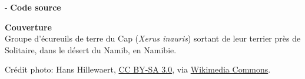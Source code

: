 \begin{adjustwidth*}{\unitlength}{-\unitlength}
  \textbf{Code source} \\
  \viewsource{\reposurl}

  \textbf{Couverture} \\
  Groupe d'écureuils de terre du Cap (\emph{Xerus inauris}) sortant de
  leur terrier près de Solitaire, dans le désert du Namib, en Namibie.

  Crédit photo: {\textcopyright} Hans Hillewaert,
  \href{https://creativecommons.org/licenses/by-sa/3.0/deed.fr}{CC BY-SA 3.0}, via
  \href{https://commons.wikimedia.org/w/index.php?curid=2429056}{Wikimedia Commons}.
\end{adjustwidth*}
\endgroup

